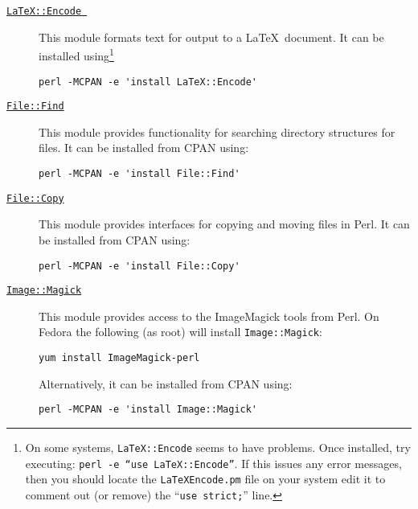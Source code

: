 \begin{description}
\item [\href{http://search.cpan.org/~andrewf/LaTeX-Encode-0.03/lib/LaTeX/Encode.pm}{{\tt LaTeX::Encode }}] This module formats text for output to a \LaTeX\ document. It can be installed using\footnote{On some systems, {\tt LaTeX::Encode} seems to have problems. Once installed, try executing: {\tt perl -e ``use LaTeX::Encode''}. If this issues any error messages, then you should locate the {\tt LaTeX\/Encode.pm} file on your system edit it to comment out (or remove) the ``{\tt use strict;}'' line.}
\begin{verbatim}
perl -MCPAN -e 'install LaTeX::Encode'
\end{verbatim}
  \item [\href{http://search.cpan.org/~jesse/perl-5.12.1/lib/File/Find.pm}{{\tt File::Find}}] This module provides functionality for searching directory structures for files. It can be installed from CPAN using:
\begin{verbatim}
perl -MCPAN -e 'install File::Find'
\end{verbatim}
  \item [\href{http://search.cpan.org/~jesse/perl-5.12.1/lib/File/Copy.pm}{{\tt File::Copy}}] This module provides interfaces for copying and moving files in Perl. It can be installed from CPAN using:
\begin{verbatim}
perl -MCPAN -e 'install File::Copy'
\end{verbatim}
  \item [\href{http://search.cpan.org/~jcristy/PerlMagick-6.59/Magick.pm}{{\tt Image::Magick}}] This module provides access to the {\sc ImageMagick} tools from Perl. On Fedora the following (as root) will install {\tt Image::Magick}:
\begin{verbatim}
yum install ImageMagick-perl
\end{verbatim}
Alternatively, it can be installed from CPAN using:
\begin{verbatim}
perl -MCPAN -e 'install Image::Magick'
\end{verbatim}


\end{description}
